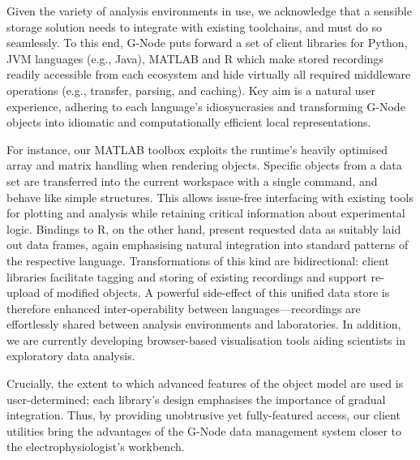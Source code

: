 \documentclass[a4paper]{article}
\begin{document}
Given the variety of analysis environments in use, we acknowledge that
a sensible storage solution needs to integrate with existing
toolchains, and must do so seamlessly. To this end, G-Node puts
forward a set of client libraries for Python, JVM languages (e.g.,
Java), MATLAB and R which make stored recordings readily accessible
from each ecosystem and hide virtually all required middleware
operations (e.g., transfer, parsing, and caching). Key aim is a
natural user experience, adhering to each language's idiosyncrasies
and transforming G-Node objects into idiomatic and computationally
efficient local representations.

For instance,
our MATLAB toolbox exploits the runtime's heavily optimised array and matrix
handling when rendering objects. Specific objects from a data set are
transferred into the current workspace with a single command, and behave
like simple structures. This allows issue-free interfacing with existing
tools for plotting and analysis while retaining critical information
about experimental logic.
Bindings to R, on the other hand,
present requested data as suitably laid out data frames, again emphasising
natural integration into standard patterns of the respective
language. Transformations of this kind are
bidirectional: client libraries facilitate tagging and storing of
existing recordings and support re-upload of modified objects. A
powerful side-effect of this unified data store is therefore enhanced
inter-operability between languages---recordings are effortlessly
shared between analysis environments and laboratories.
In addition, we are
currently developing browser-based visualisation tools aiding
scientists in exploratory data analysis.

Crucially, the extent to which advanced features of the object model
are used is user-determined; each library's design emphasises the
importance of gradual integration. Thus, by providing unobtrusive yet
fully-featured access, our client utilities bring the advantages of
the G-Node data management system closer to the electrophysiologist's
workbench.
\end{document}
